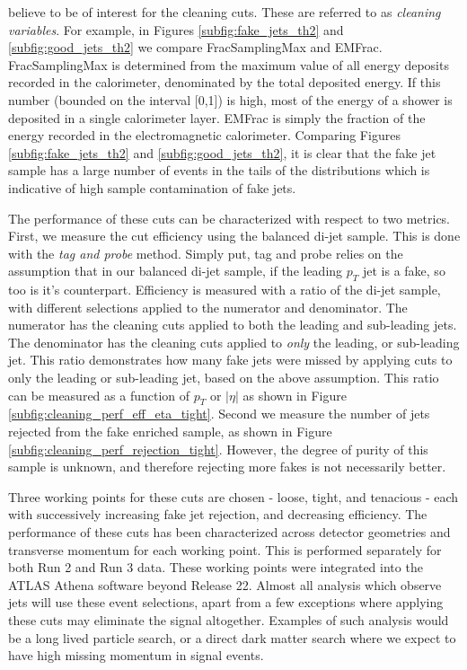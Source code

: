 \documentclass[12pt]{article}
\begin{document}
believe to be of interest for the cleaning cuts. These are referred to as
\textit{cleaning variables}. For example, in Figures \ref{subfig:fake_jets_th2}
and \ref{subfig:good_jets_th2} we compare FracSamplingMax and EMFrac.
FracSamplingMax is determined from the maximum value of all energy deposits
recorded in the calorimeter, denominated by the total deposited energy. If this
number (bounded on the interval [0,1]) is high, most of the energy of a shower
is deposited in a single calorimeter layer. EMFrac is simply the fraction of the
energy recorded in the electromagnetic calorimeter. Comparing Figures
\ref{subfig:fake_jets_th2} and \ref{subfig:good_jets_th2}, it is clear that the
fake jet sample has a large number of events in the tails of the distributions
which is indicative of high sample contamination of fake jets.


The performance of these cuts can be characterized with respect to two metrics.
First, we measure the cut efficiency using the balanced di-jet sample. This is
done with the \textit{tag and probe} method. Simply put, tag and probe relies on
the assumption that in our balanced di-jet sample, if the leading $p_T$ jet is a
fake, so too is it's counterpart. Efficiency is measured with a ratio of the
di-jet sample, with different selections applied to the numerator and
denominator. The numerator has the cleaning cuts applied to both the leading and
sub-leading jets. The denominator has the cleaning cuts applied to \textit{only}
the leading, or sub-leading jet. This ratio demonstrates how many fake jets were
missed by applying cuts to only the leading or sub-leading jet, based on the
above assumption. This ratio can be measured as a function of $p_T$ or $|\eta|$
as shown in Figure \ref{subfig:cleaning_perf_eff_eta_tight}. Second we measure
the number of jets rejected from the fake enriched sample, as shown in Figure
\ref{subfig:cleaning_perf_rejection_tight}. However, the degree of purity of
this sample is unknown, and therefore rejecting more fakes is not necessarily
better.  


Three working points for these cuts are chosen - loose, tight, and tenacious -
each with successively increasing fake jet rejection, and decreasing efficiency.
The performance of these cuts has been characterized across detector geometries
and transverse momentum for each working point. This is performed separately for
both Run 2 and Run 3 data. These working points were integrated into the ATLAS
Athena software \cite{atlas_simulation} beyond Release 22. Almost all analysis
which observe jets will use these event selections, apart from a few exceptions
where applying these cuts may eliminate the signal altogether. Examples of such
analysis would be a long lived particle search, or a direct dark matter search
where we expect to have high missing momentum in signal events.
\end{document}
